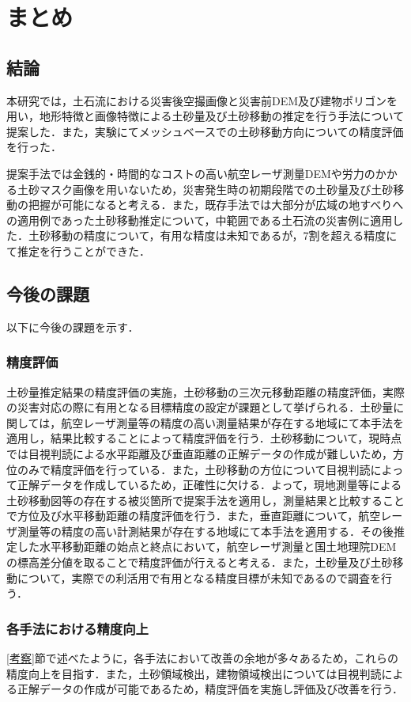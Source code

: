 \chapter{まとめ}
  \section{結論}
    本研究では，土石流における災害後空撮画像と災害前DEM及び建物ポリゴンを用い，地形特徴と画像特徴による土砂量及び土砂移動の推定を行う手法について提案した．また，実験にてメッシュベースでの土砂移動方向についての精度評価を行った．

    提案手法では金銭的・時間的なコストの高い航空レーザ測量DEMや労力のかかる土砂マスク画像を用いないため，災害発生時の初期段階での土砂量及び土砂移動の把握が可能になると考える．また，既存手法では大部分が広域の地すべりへの適用例であった土砂移動推定について，中範囲である土石流の災害例に適用した．土砂移動の精度について，有用な精度は未知であるが，7割を超える精度にて推定を行うことができた．


  \section{今後の課題}
    以下に今後の課題を示す．


    \subsection*{精度評価}
      土砂量推定結果の精度評価の実施，土砂移動の三次元移動距離の精度評価，実際の災害対応の際に有用となる目標精度の設定が課題として挙げられる．土砂量に関しては，航空レーザ測量等の精度の高い測量結果が存在する地域にて本手法を適用し，結果比較することによって精度評価を行う．土砂移動について，現時点では目視判読による水平距離及び垂直距離の正解データの作成が難しいため，方位のみで精度評価を行っている．また，土砂移動の方位について目視判読によって正解データを作成しているため，正確性に欠ける．よって，現地測量等による土砂移動図等の存在する被災箇所で提案手法を適用し，測量結果と比較することで方位及び水平移動距離の精度評価を行う．また，垂直距離について，航空レーザ測量等の精度の高い計測結果が存在する地域にて本手法を適用する．その後推定した水平移動距離の始点と終点において，航空レーザ測量と国土地理院DEMの標高差分値を取ることで精度評価が行えると考える．また，土砂量及び土砂移動について，実際での利活用で有用となる精度目標が未知であるので調査を行う．


    \subsection*{各手法における精度向上}
      \ref{考察}節で述べたように，各手法において改善の余地が多々あるため，これらの精度向上を目指す．また，土砂領域検出，建物領域検出については目視判読による正解データの作成が可能であるため，精度評価を実施し評価及び改善を行う．


